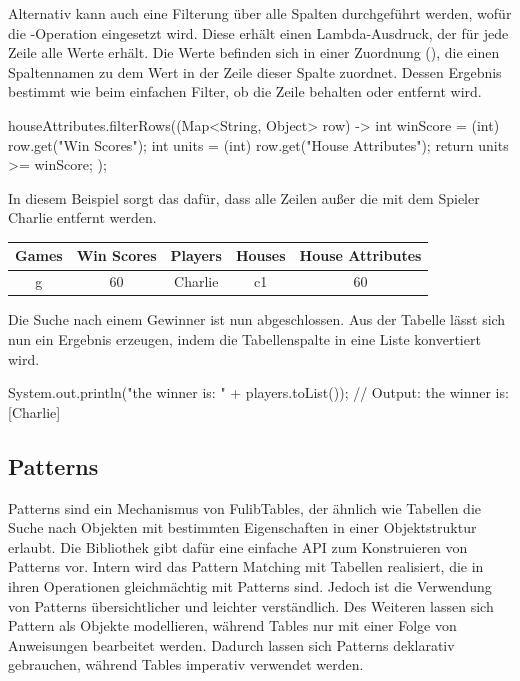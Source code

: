 Alternativ kann auch eine Filterung über alle Spalten durchgeführt werden, wofür die -Operation eingesetzt wird.
Diese erhält einen Lambda-Ausdruck, der für jede Zeile alle Werte erhält.
Die Werte befinden sich in einer Zuordnung (), die einen Spaltennamen zu dem Wert in der Zeile dieser Spalte zuordnet.
Dessen Ergebnis bestimmt wie beim einfachen Filter, ob die Zeile behalten oder entfernt wird.

\begin{jcodeblock}
    houseAttributes.filterRows((Map<String, Object> row) -> {
        int winScore = (int) row.get("Win Scores");
        int units = (int) row.get("House Attributes");
        return units >= winScore;
    });
\end{jcodeblock}

In diesem Beispiel sorgt das dafür, dass alle Zeilen außer die mit dem Spieler Charlie entfernt werden.

\begin{tabular}{|c|c|c|c|c|}
    \hline
    \textbf{Games} & \textbf{Win Scores} & \textbf{Players} & \textbf{Houses} & \textbf{House Attributes} \\
    \hline
    g & 60 & Charlie & c1 & 60 \\
    \hline
\end{tabular}

Die Suche nach einem Gewinner ist nun abgeschlossen.
Aus der Tabelle lässt sich nun ein Ergebnis erzeugen, indem die Tabellenspalte  in eine Liste konvertiert wird.

\begin{jcodeblock}
    System.out.println("the winner is: " + players.toList());
    // Output: the winner is: [Charlie]
\end{jcodeblock}

\subsection{Patterns}\label{subsec:patterns}

Patterns sind ein Mechanismus von FulibTables, der ähnlich wie Tabellen die Suche nach Objekten mit bestimmten Eigenschaften in einer Objektstruktur erlaubt.
Die Bibliothek gibt dafür eine einfache API zum Konstruieren von Patterns vor.
Intern wird das Pattern Matching mit Tabellen realisiert,
die in ihren Operationen gleichmächtig mit Patterns sind.
Jedoch ist die Verwendung von Patterns übersichtlicher und leichter verständlich.
Des Weiteren lassen sich Pattern als Objekte modellieren,
während Tables nur mit einer Folge von Anweisungen bearbeitet werden.
Dadurch lassen sich Patterns deklarativ gebrauchen, während Tables imperativ verwendet werden.

